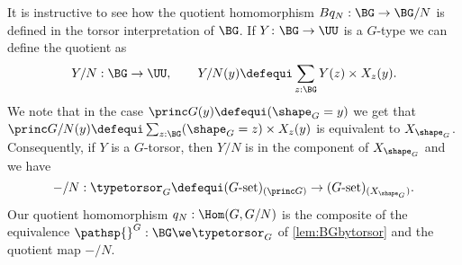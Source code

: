 \begin{remark}
It is instructive to see how the quotient homomorphism $Bq_N:\BG\to \BG/N$ is defined in the torsor interpretation of $\BG$.  If $Y\colon \BG\to\UU$ is a $G$-type we can define the quotient as
$$
Y/N:\BG\to\UU,\qquad Y/N(y)\defequi\sum_{z:\BG}Y(z)\times X_z(y).
$$
We note that in the case $\princ G(y)\defequi (\shape_G=y)$ we get
that
$
\princ G /N(y)\defequi\sum_{z:\BG}(\shape_G=z)\times X_z(y)
$
is equivalent to $X_{\shape_G}$.  Consequently, if $Y$ is a $G$-torsor, then $Y/N$ is in the component of $X_{\shape_G}$ and we have
$$-/N:\typetorsor_G\defequi (G\text{-set})_{(\princ G)}\to (G\text{-set})_{(X_{\shape_G})}.
$$ Our quotient homomorphism $q_N:\Hom(G,G/N)$ is the composite of the equivalence $\pathsp{}^G:\BG\we\typetorsor_G$ of \cref{lem:BGbytorsor} and the quotient map $-/N$.
\end{remark}

